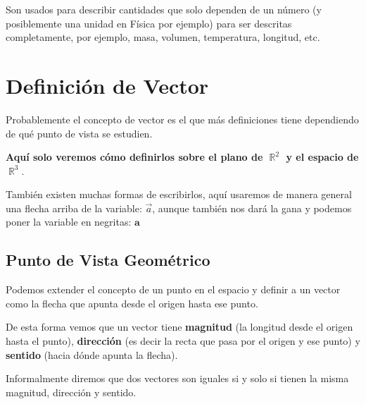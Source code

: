 \documentclass[12pt, fleqn]{report}                             %
\DeclareMathOperator \Reals        {\mathbb{R}}                 %
\newcommand{\bVec}[1]{\mathbf{#1}}                              %
\begin{document}
            Son usados para describir cantidades que solo dependen de un número (y posiblemente una
            unidad en Física por ejemplo) para ser descritas completamente, por ejemplo, masa,
            volumen, temperatura, longitud, etc.


        \vspace{1em}
        \section{Definición de Vector}
        
            Probablemente el concepto de vector es el que más definiciones tiene dependiendo de qué
            punto de vista se estudien.

            \textbf{Aquí solo veremos cómo definirlos sobre el plano de $\Reals^2$ y el espacio de $\Reals^3$}.

            También existen muchas formas de escribirlos, aquí usaremos de manera general una flecha
            arriba de la variable: $\vec{a}$, aunque también nos dará la gana y podemos poner la
            variable en negritas: $\bVec{a}$

            \subsection{Punto de Vista Geométrico}
            
                Podemos extender el concepto de un punto en el espacio y definir a un vector
                como la flecha que apunta desde el origen hasta ese punto.

                De esta forma vemos que un vector tiene \textbf{magnitud} (la longitud desde
                el origen hasta el punto), \textbf{dirección} (es decir la recta que pasa por
                el origen y ese punto) y \textbf{sentido} (hacia dónde apunta la flecha).
                
                Informalmente diremos que dos vectores son iguales si y solo si tienen la misma magnitud, dirección y sentido.
                
\end{document}
